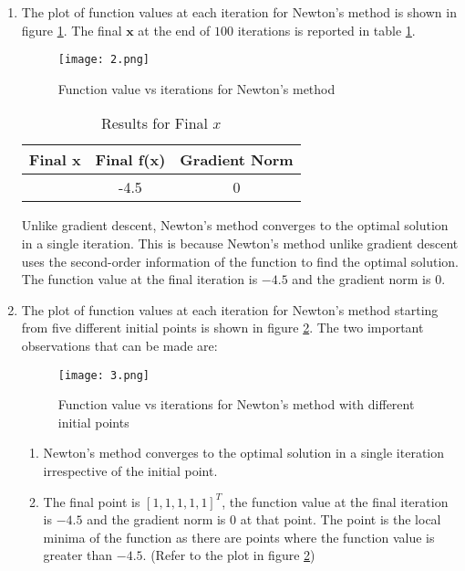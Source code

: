 \documentclass[12pt,a4paper]{article}
\theoremstyle{remark}
\begin{document}
\begin{enumerate}
    \item The plot of function values at each iteration for Newton's method is shown in figure \ref{fig:newton_f2_value_vs_iterations}. The final $\mathbf{x}$ at the end of $100$ iterations is reported in table \ref{table:newton_results_final_x}.
    
    \begin{figure}
        \centering
        \texttt{[image: 2.png]}
        \caption{Function value vs iterations for Newton's method}
        \label{fig:newton_f2_value_vs_iterations}
    \end{figure}

    \begin{table}[ht]
        \centering
        \begin{tabular}{|c|c|c|}
        \hline
        \textbf{Final x} & \textbf{Final f(x)} & \textbf{Gradient Norm} \\
        \hline
        [1.0, 1.0, 1.0, 1.0, 1.0] & -4.5 & 0 \\
        \hline
        \end{tabular}
        \caption{Results for Final $x$}
        \label{table:newton_results_final_x}
    \end{table}
    
    Unlike gradient descent, Newton's method converges to the optimal solution in a single iteration. This is because Newton's method unlike gradient descent uses the second-order information of the function to find the optimal solution. The function value at the final iteration is $-4.5$ and the gradient norm is $0$.

    \item The plot of function values at each iteration for Newton's method starting from five different initial points is shown in figure \ref{fig:newton_f2_value_vs_iterations_different_initial_points}. The two important observations that can be made are:
    
    \begin{figure}
        \centering
        \texttt{[image: 3.png]}
        \caption{Function value vs iterations for Newton's method with different initial points}
        \label{fig:newton_f2_value_vs_iterations_different_initial_points}
    \end{figure}
    
    \begin{enumerate}
        \item Newton's method converges to the optimal solution in a single iteration irrespective of the initial point.
        \item The final point is $[1, 1, 1, 1, 1]^T$, the function value at the final iteration is $-4.5$ and the gradient norm is $0$ at that point. The point is the local minima of the function as there are points where the function value is greater than $-4.5$. (Refer to the plot in figure \ref{fig:newton_f2_value_vs_iterations_different_initial_points})
    \end{enumerate}


\end{enumerate}
\end{document}
